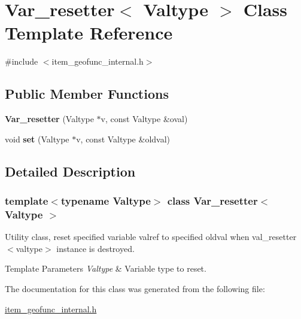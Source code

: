 \hypertarget{classVar__resetter}{}\section{Var\+\_\+resetter$<$ Valtype $>$ Class Template Reference}
\label{classVar__resetter}


{\ttfamily \#include $<$item\+\_\+geofunc\+\_\+internal.\+h$>$}

\subsection*{Public Member Functions}
\begin{DoxyCompactItemize}
\item 
\mbox{\label{classVar__resetter_a88e85f7d17629ba813636cacadd81f5c}} 
{\bfseries Var\+\_\+resetter} (Valtype $\ast$v, const Valtype \&oval)
\item 
\mbox{\label{classVar__resetter_a7535a1d44dd3638c58582f9c81dd3c02}} 
void {\bfseries set} (Valtype $\ast$v, const Valtype \&oldval)
\end{DoxyCompactItemize}


\subsection{Detailed Description}
\subsubsection*{template$<$typename Valtype$>$\newline
class Var\+\_\+resetter$<$ Valtype $>$}

Utility class, reset specified variable \textquotesingle{}valref\textquotesingle{} to specified \textquotesingle{}oldval\textquotesingle{} when val\+\_\+resetter$<$valtype$>$ instance is destroyed. 
\begin{DoxyTemplParams}{Template Parameters}
{\em Valtype} & Variable type to reset. \\
\hline
\end{DoxyTemplParams}


The documentation for this class was generated from the following file\+:\begin{DoxyCompactItemize}
\item 
\mbox{\hyperlink{item__geofunc__internal_8h}{item\+\_\+geofunc\+\_\+internal.\+h}}\end{DoxyCompactItemize}
